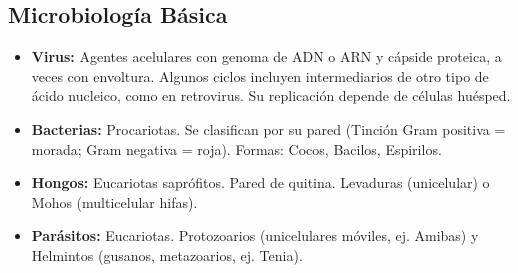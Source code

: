 \subsection{Microbiología Básica}
\begin{itemize}
    \item \textbf{Virus:} Agentes acelulares con genoma de ADN o ARN y cápside proteica, a veces con envoltura. Algunos ciclos incluyen intermediarios de otro tipo de ácido nucleico, como en retrovirus. Su replicación depende de células huésped.
    \item \textbf{Bacterias:} Procariotas. Se clasifican por su pared (Tinción Gram positiva = morada; Gram negativa = roja). Formas: Cocos, Bacilos, Espirilos.
    \item \textbf{Hongos:} Eucariotas saprófitos. Pared de quitina. Levaduras (unicelular) o Mohos (multicelular hifas).
    \item \textbf{Parásitos:} Eucariotas. Protozoarios (unicelulares móviles, ej. Amibas) y Helmintos (gusanos, metazoarios, ej. Tenia).
\end{itemize}

\newpage
